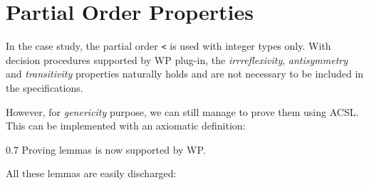 \section{Partial Order Properties}
\label{compare}

In the case study, the partial order \verb$<$ is used with integer
types only. With decision procedures supported by \textsf{WP} plug-in,
the \emph{irrreflexivity}, \emph{antisymmetry} and \emph{transitivity}
properties naturally holds and are not necessary to be included in the
specifications.

However, for \emph{genericity} purpose, we can still manage to prove
them using \textsf{ACSL}. This can be implemented with an axiomatic
definition:

\begin{feature}{0.7}
  Proving lemmas is now supported by \textsf{WP}.
\end{feature}


All these lemmas are easily discharged:

